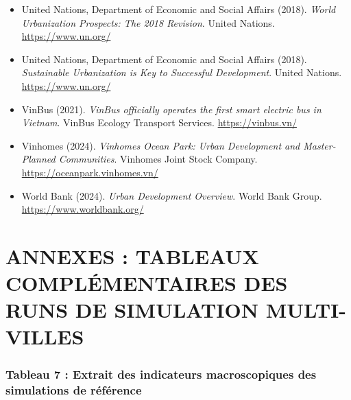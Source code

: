 \documentclass[10pt, a4paper]{article}
\begin{document}
\begin{itemize}
\item
  United Nations, Department of Economic and Social Affairs (2018).
  \emph{World Urbanization Prospects: The 2018 Revision}. United
  Nations. \url{https://www.un.org/}
\item
  United Nations, Department of Economic and Social Affairs (2018).
  \emph{Sustainable Urbanization is Key to Successful Development}.
  United Nations. \url{https://www.un.org/}
\item
  VinBus (2021). \emph{VinBus officially operates the first smart
  electric bus in Vietnam}. VinBus Ecology Transport Services.
  \url{https://vinbus.vn/}
\item
  Vinhomes (2024). \emph{Vinhomes Ocean Park: Urban Development and
  Master-Planned Communities}. Vinhomes Joint Stock Company.
  \url{https://oceanpark.vinhomes.vn/}
\item
  World Bank (2024). \emph{Urban Development Overview}. World Bank
  Group. \url{https://www.worldbank.org/}
\end{itemize}

\newpage

\section{ANNEXES : TABLEAUX COMPLÉMENTAIRES DES RUNS DE SIMULATION
MULTI-VILLES}\label{annexes-tableaux-compluxe9mentaires-des-runs-de-simulation-multi-villes}

\subsubsection{Tableau 7 : Extrait des indicateurs macroscopiques des
simulations de
référence}\label{tableau-7-extrait-des-indicateurs-macroscopiques-des-simulations-de-ruxe9fuxe9rence}
\end{document}

